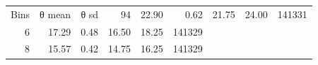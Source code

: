 \begin{tabular}{rrrrrr}
\toprule
Bins & θ mean & θ sd & 94%
 & 22.90 & 0.62 & 21.75 & 24.00 & 141331 \\
6 & 17.29 & 0.48 & 16.50 & 18.25 & 141329 \\
8 & 15.57 & 0.42 & 14.75 & 16.25 & 141329 \\
\bottomrule
\end{tabular}
